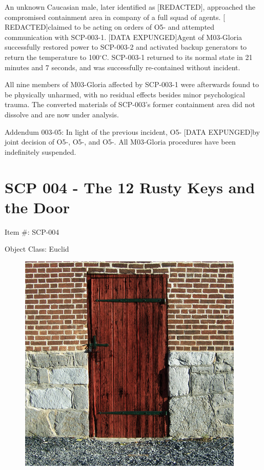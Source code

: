 \documentclass[a4paper, 11pt]{article}
\newcommand{\lb}{\ensuremath{[}}
\newcommand{\rb}{\ensuremath{]}}
\newcommand{\degree}{$^{\circ}$}
\newcommand{\redacted}{\lb REDACTED\rb}
\newcommand{\expunged}{\lb DATA EXPUNGED\rb}
\begin{document}
An unknown Caucasian male, later identified as \redacted, approached the compromised containment area in company of a full squad of agents. \redacted claimed to be acting on orders of O5- and attempted communication with SCP-003-1. \expunged Agent  of M03-Gloria successfully restored power to SCP-003-2 and activated backup generators to return the temperature to 100\degree C. SCP-003-1 returned to its normal state in 21 minutes and 7 seconds, and was successfully re-contained without incident.

All nine members of M03-Gloria affected by SCP-003-1 were afterwards found to be physically unharmed, with no residual effects besides minor psychological trauma. The converted materials of SCP-003's former containment area did not dissolve and are now under analysis.

Addendum 003-05: In light of the previous incident, O5- \expunged by joint decision of O5-, O5-, and O5-. All M03-Gloria procedures have been indefinitely suspended.

\newpage
\section{SCP 004 - The 12 Rusty Keys and the Door}
Item \#: SCP-004

Object Class: Euclid

\begin{figure}
\includegraphics[scale=1.6]{img/scp/004.jpg}
\end{figure}
\end{document}
